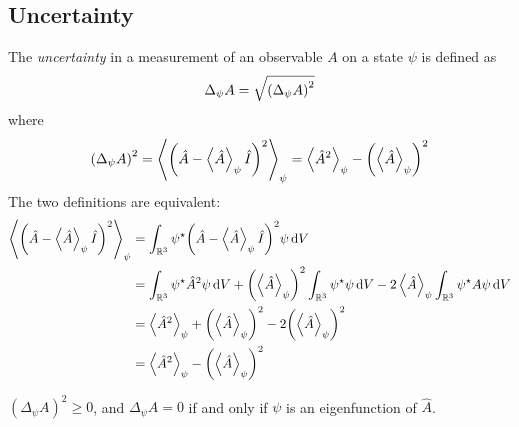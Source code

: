 \subsection{Uncertainty}
\begin{definition}
	The \textit{uncertainty} in a measurement of an observable \( A \) on a state \( \psi \) is defined as
	\[
		\Delta_\psi A = \sqrt{\qty(\Delta_\psi A)^2}
	\]
	where
	\[
		\qty(\Delta_\psi A)^2 = \left\langle{\qty(\hat A - \left\langle{\hat A}\right\rangle_\psi \hat I)^2}\right\rangle_\psi = \left\langle{\hat A^2}\right\rangle_\psi - \qty(\left\langle{\hat A}\right\rangle_\psi)^2
	\]
	The two definitions are equivalent:
	\begin{align*}
		\left\langle{\qty(\hat A - \left\langle{\hat A}\right\rangle_\psi \hat I)^2}\right\rangle_\psi & = \int_{\mathbb R^3} \psi^\star \qty(\hat A - \left\langle{\hat A}\right\rangle_\psi \hat I)^2 \psi \dd{V}                                                                                                          \\
		                                                         & = \int_{\mathbb R^3} \psi^\star \hat A^2 \psi \dd{V} + \qty(\left\langle{\hat A}\right\rangle_\psi)^2 \int_{\mathbb R^3} \psi^\star \psi \dd{V} - 2 \left\langle{\hat A}\right\rangle_\psi \int_{\mathbb R^3} \psi^\star A \psi \dd{V} \\
		                                                         & = \left\langle{\hat A^2}\right\rangle_{\psi} + \qty(\left\langle{\hat A}\right\rangle_{\psi})^2 - 2\qty(\left\langle{\hat A}\right\rangle_\psi)^2                                                                                                         \\
		                                                         & = \left\langle{\hat A^2}\right\rangle_{\psi} - \qty(\left\langle{\hat A}\right\rangle_{\psi})^2
	\end{align*}
\end{definition}
\begin{lemma}
	\( (\Delta_\psi A)^2 \geq 0 \), and \( \Delta_\psi A = 0 \) if and only if \( \psi \) is an eigenfunction of \( \hat A \).
\end{lemma}
